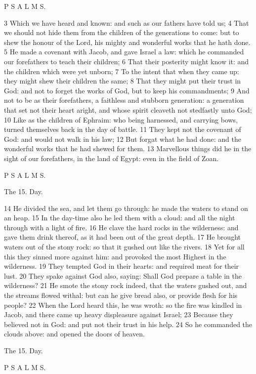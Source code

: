 P S A L M S.

3 Which we have heard and known: and such as our fathers have told us; 4 That we should not hide them from the children of the generations to come: but to shew the honour of the Lord, his mighty and wonderful works that he hath done. 5 He made a covenant with Jacob, and gave Israel a law: which he commanded our forefathers to teach their children; 6 That their posterity might know it: and the children which were yet unborn; 7 To the intent that when they came up: they might shew their children the same; 8 That they might put their trust in God: and not to forget the works of God, but to keep his commandments; 9 And not to be as their forefathers, a faithless and stubborn generation: a generation that set not their heart aright, and whose spirit cleaveth not stedfastly unto God; 10 Like as the children of Ephraim: who being harnessed, and carrying bows, turned themselves back in the day of battle. 11 They kept not the covenant of God: and would not walk in his law; 12 But forgat what he had done: and the wonderful works that he had shewed for them. 13 Marvellous things did he in the sight of our forefathers, in the land of Egypt: even in the field of Zoan.

P S A L M S.

The 15. Day.

14 He divided the sea, and let them go through: he made the waters to stand on an heap. 15 In the day-time also he led them with a cloud: and all the night through with a light of fire. 16 He clave the hard rocks in the wilderness: and gave them drink thereof, as it had been out of the great depth. 17 He brought waters out of the stony rock: so that it gushed out like the rivers. 18 Yet for all this they sinned more against him: and provoked the most Highest in the wilderness. 19 They tempted God in their hearts: and required meat for their lust. 20 They spake against God also, saying: Shall God prepare a table in the wilderness? 21 He smote the stony rock indeed, that the waters gushed out, and the streams flowed withal: but can he give bread also, or provide flesh for his people? 22 When the Lord heard this, he was wroth: so the fire was kindled in Jacob, and there came up heavy displeasure against Israel; 23 Because they believed not in God: and put not their trust in his help. 24 So he commanded the clouds above: and opened the doors of heaven.

The 15. Day.

P S A L M S.

